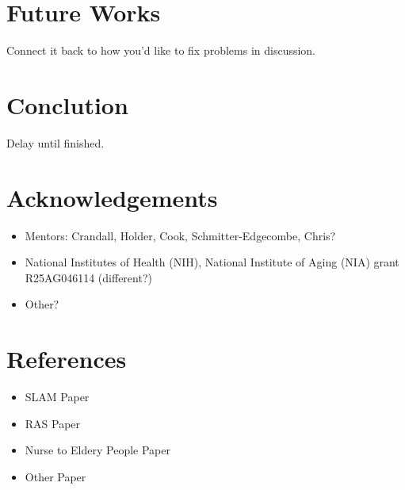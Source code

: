 \documentclass[11pt, draft, a4paper]{IEEEtran}
\begin{document}
\section{Future Works}
Connect it back to how you'd like to fix problems in discussion.


\section{Conclution}
Delay until finished.


\section{Acknowledgements}
\begin{itemize}
    \item Mentors: Crandall, Holder, Cook, Schmitter-Edgecombe, Chris?
    \item National Institutes of Health (NIH), National Institute of Aging (NIA) grant R25AG046114  (different?)
    \item Other?
\end{itemize}


\section{References}
\begin{itemize}
    \item SLAM Paper
    \item RAS Paper
    \item Nurse to Eldery People Paper
    \item Other Paper
\end{itemize}
\end{document}
